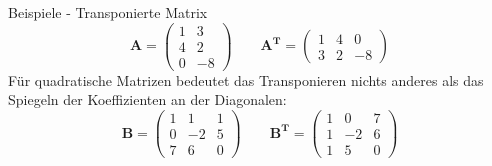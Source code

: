 \begin{frame}{Beispiele - Transponierte Matrix}
		\[
		\pmb{A} = \begin{pmatrix}
		1 & 3  \\
		4 & 2 \\
		0 & -8
		\end{pmatrix}
		 \qquad 		\pmb{A^{T}} = \begin{pmatrix}
			1 & 4 & 0 \\
			3 & 2 & -8
		\end{pmatrix}
		\]
		Für quadratische Matrizen bedeutet das Transponieren nichts anderes als das Spiegeln der Koeffizienten an der Diagonalen:
		\[
				\pmb{B} = \begin{pmatrix}
				1 & 1 & 1  \\
				0 & -2 & 5\\
				7 & 6 & 0
				\end{pmatrix}
				\qquad 	\pmb{B^{T}} = \begin{pmatrix}
				1 & 0 & 7 \\
				1 & -2 & 6 \\
				1 & 5 & 0
				\end{pmatrix}		
		\]
					
\end{frame}

